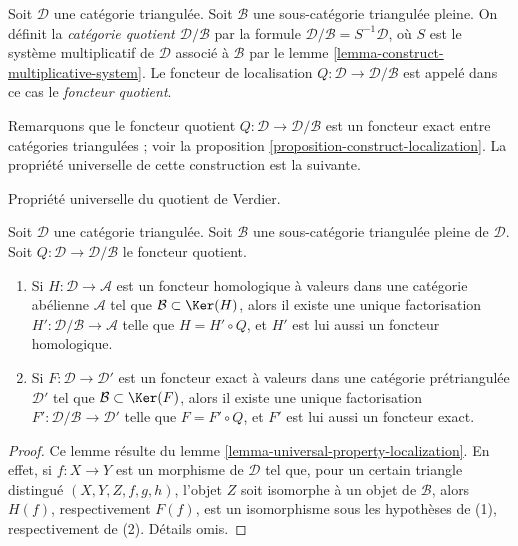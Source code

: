 \begin{definition}
\label{definition-quotient-category}
Soit $\mathcal{D}$ une catégorie triangulée.
Soit $\mathcal{B}$ une sous-catégorie triangulée pleine.
On définit la {\it catégorie quotient $\mathcal{D}/\mathcal{B}$} par la formule
$\mathcal{D}/\mathcal{B} = S^{-1}\mathcal{D}$, où $S$ est le système
multiplicatif de $\mathcal{D}$ associé à $\mathcal{B}$ par le
lemme \ref{lemma-construct-multiplicative-system}.
Le foncteur de localisation $Q : \mathcal{D} \to \mathcal{D}/\mathcal{B}$ est
appelé dans ce cas le {\it foncteur quotient}.
\end{definition}

\noindent
Remarquons que le foncteur quotient
$Q : \mathcal{D} \to \mathcal{D}/\mathcal{B}$ est un foncteur exact entre
catégories triangulées ; voir la proposition
\ref{proposition-construct-localization}.
La propriété universelle de cette construction est la suivante.

\begin{lemma}
\label{lemma-universal-property-quotient}
\begin{slogan}
Propriété universelle du quotient de Verdier.
\end{slogan}
Soit $\mathcal{D}$ une catégorie triangulée. Soit $\mathcal{B}$ une
sous-catégorie triangulée pleine de $\mathcal{D}$. Soit
$Q : \mathcal{D} \to \mathcal{D}/\mathcal{B}$ le foncteur quotient.
\begin{enumerate}
\item Si $H : \mathcal{D} \to \mathcal{A}$ est un foncteur homologique à
valeurs dans une catégorie abélienne $\mathcal{A}$ tel que
$\mathcal{B} \subset \Ker(H)$, alors il existe une unique factorisation
$H' : \mathcal{D}/\mathcal{B} \to \mathcal{A}$ telle que $H = H' \circ Q$, et
$H'$ est lui aussi un foncteur homologique.
\item Si $F : \mathcal{D} \to \mathcal{D}'$ est un foncteur exact à valeurs
dans une catégorie prétriangulée $\mathcal{D}'$ tel que
$\mathcal{B} \subset \Ker(F)$, alors il existe une unique factorisation
$F' : \mathcal{D}/\mathcal{B} \to \mathcal{D}'$ telle que $F = F' \circ Q$, et
$F'$ est lui aussi un foncteur exact.
\end{enumerate}
\end{lemma}

\begin{proof}
Ce lemme résulte du lemme \ref{lemma-universal-property-localization}.
En effet, si $f : X \to Y$ est un morphisme de $\mathcal{D}$ tel que, pour un
certain triangle distingué $(X, Y, Z, f, g, h)$, l'objet $Z$ soit isomorphe à
un objet de $\mathcal{B}$, alors $H(f)$, respectivement $F(f)$, est un
isomorphisme sous les hypothèses de (1), respectivement de (2).
Détails omis.
\end{proof}

